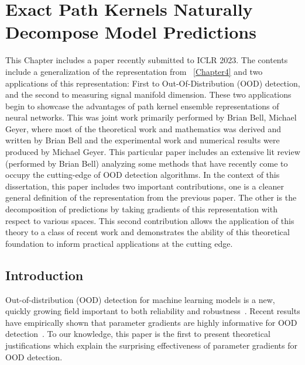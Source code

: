 \chapter{Exact Path Kernels Naturally Decompose Model Predictions}
\label{Chapter4a}

This Chapter includes a paper recently submitted to ICLR 2023. The
contents include a generalization of the representation from
~\ref{Chapter4} and two applications of this representation: First to
Out-Of-Distribution (OOD) detection, and the second to measuring
signal manifold dimension. These two applications begin to showcase
the advantages of path kernel ensemble representations of neural
networks. This was joint work primarily performed by Brian Bell,
Michael Geyer, where most of the theoretical work and mathematics was
derived and written by Brian Bell and the experimental work and
numerical results were produced by Michael Geyer. This particular
paper includes an extensive lit review (performed by Brian Bell)
analyzing some methods that have recently come to occupy the
cutting-edge of OOD detection algorithms. In the context of this
dissertation, this paper includes two important contributions, one is
a cleaner general definition of the representation from the previous
paper. The other is the decomposition of predictions by taking
gradients of this representation with respect to various spaces. This
second contribution allows the application of this theory to a class
of recent work and demonstrates the ability of this theoretical
foundation to inform practical applications at the cutting edge. 




\section{Introduction}

Out-of-distribution (OOD) detection for machine learning models is a new, quickly growing field important to both reliability and robustness~\citep{hendrycks2019, biggio2014, hendrycks2017, desilva2023, yang2021, filos2020autonomous}.
Recent results have empirically shown that parameter gradients are highly informative for OOD detection~\citep{behpour2023, djurisic2023extremely, huang2021}.
To our knowledge, this paper is the first to present theoretical justifications which explain the surprising effectiveness of parameter gradients for OOD detection.

